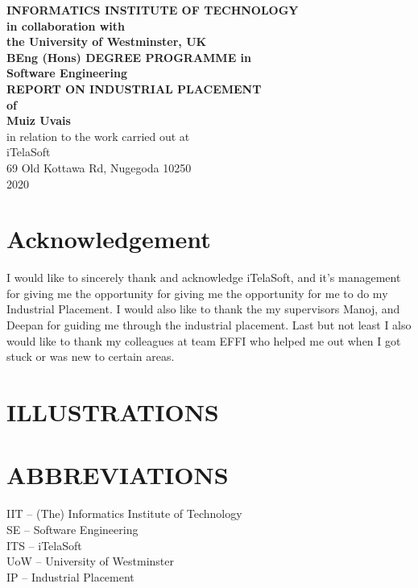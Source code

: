 \documentclass[12pt]{article}
\begin{document}
\begin{titlepage}
\begin{center}
    {\Large\bfseries INFORMATICS INSTITUTE OF TECHNOLOGY \\ in collaboration with \\
    the University of Westminster, UK\\}
\vspace{1cm}
{\Large \bfseries BEng (Hons) DEGREE PROGRAMME in \\ Software Engineering\\}
\vspace{2.5cm}
{\Large\bfseries REPORT ON INDUSTRIAL PLACEMENT \\ of \\ Muiz Uvais\\}
\vspace{2cm}
{\Large in relation to the work carried out at \\ iTelaSoft \\ 69 Old Kottawa Rd, Nugegoda 10250 \\ 2020\\}

\end{center}

\end{titlepage}

\section*{Acknowledgement}
I would like to sincerely thank and acknowledge iTelaSoft,
and it's management for giving me the opportunity for giving 
me the opportunity for me to do my Industrial Placement.
\newline
\newline
I would also like to thank the my supervisors
Manoj, and Deepan for guiding me through the industrial placement. \newline \newline 
Last but not least
I also would like to thank my colleagues at team EFFI who helped me out when I got stuck or was new to
certain areas.
\newpage

\tableofcontents

\section*{ILLUSTRATIONS} 
\section*{ABBREVIATIONS}
{\large IIT -- (The) Informatics Institute of Technology\\}
\newline
{\large SE -- Software Engineering\\}
\newline
{\large ITS -- iTelaSoft\\}
\newline
{\large UoW -- University of Westminster\\}
\newline
{\large IP -- Industrial Placement}
\newpage
\end{document}
